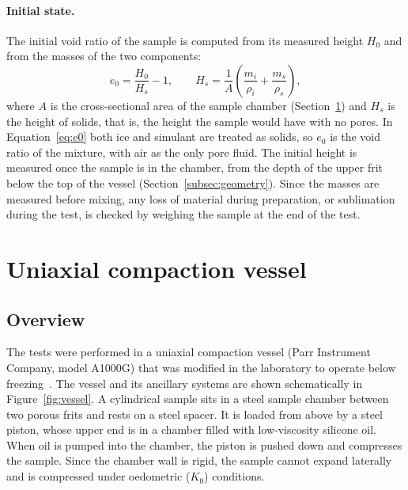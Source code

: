 \paragraph{Initial state.} The initial void ratio of the sample is computed from its measured height $H_0$ and from the masses of the two components:
\begin{equation}
    e_0 = \frac{H_0}{H_s} - 1, \qquad H_s = \frac{1}{A}\left(\frac{m_i}{\rho_i} + \frac{m_s}{\rho_s}\right),
    \label{eq:e0}
\end{equation}
where $A$ is the cross-sectional area of the sample chamber (Section~\ref{sec:vessel}) and $H_s$ is the height of solids, that is, the height the sample would have with no pores. In Equation~\eqref{eq:e0} both ice and simulant are treated as solids, so $e_0$ is the void ratio of the mixture, with air as the only pore fluid. The initial height is measured once the sample is in the chamber, from the depth of the upper frit below the top of the vessel (Section~\ref{subsec:geometry}). Since the masses are measured before mixing, any loss of material during preparation, or sublimation during the test, is checked by weighing the sample at the end of the test.

\section{Uniaxial compaction vessel}
\label{sec:vessel}

\subsection{Overview}

The tests were performed in a uniaxial compaction vessel (Parr Instrument Company, model A1000G) that was modified in the laboratory to operate below freezing~\cite{skarbek2025data}. The vessel and its ancillary systems are shown schematically in Figure~\ref{fig:vessel}. A cylindrical sample sits in a steel sample chamber between two porous frits and rests on a steel spacer. It is loaded from above by a steel piston, whose upper end is in a chamber filled with low-viscosity silicone oil. When oil is pumped into the chamber, the piston is pushed down and compresses the sample. Since the chamber wall is rigid, the sample cannot expand laterally and is compressed under oedometric ($K_0$) conditions.

